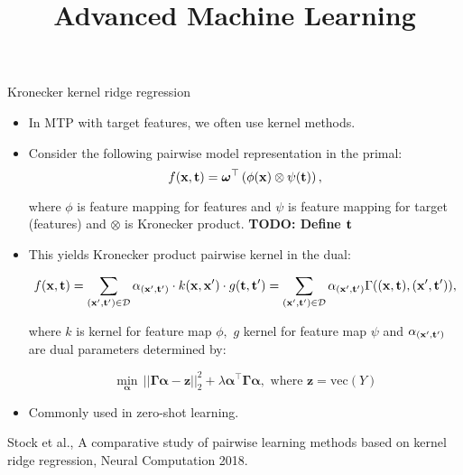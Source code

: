 \documentclass[11pt,compress,t,notes=noshow, xcolor=table]{beamer}
\title{Advanced Machine Learning}
\date{}
\begin{document}



\sloppy



\begin{frame}{Kronecker kernel ridge regression}
	\begin{itemize}

    	\item In MTP with target features, we often use kernel methods.
    
    	\item Consider the following pairwise model representation in the primal: 
    		\begin{equation*}
    			\label{eq:pairwise}
    			f(\mathbf{x},\mathbf{t}) = \bm\omega^\top \left(\phi(\mathbf{x}) \otimes \psi(\mathbf{t}) \right) ,
    		\end{equation*}
    
    	where $\phi$ is feature mapping for features and $\psi$ is feature mapping for target (features) and $\otimes$ is Kronecker product. \textbf{TODO: Define $\mathbf{t}$}
    
    	\item This yields Kronecker product pairwise kernel in the dual:
    	
    	\begin{eqnarray*} 
    		f(\mathbf{x},\mathbf{t})= \sum_{(\mathbf{x}',\mathbf{t}') \in \mathcal{D}} \alpha_{(\mathbf{x}',\mathbf{t}')}  \cdot  k(\mathbf{x},\mathbf{x}') \cdot g(\mathbf{t},\mathbf{t}')  = \sum_{(\mathbf{x}',\mathbf{t}') \in \mathcal{D}} \alpha_{(\mathbf{x}',\mathbf{t}')} \Gamma((\mathbf{x},\mathbf{t}),(\mathbf{x}',\mathbf{t}')),
    	\end{eqnarray*}
    
    	where $k$ is kernel for feature map $\phi,$  $g$ kernel for feature map $\psi$  and $\alpha_{(\mathbf{x}',\mathbf{t}')}$ are dual parameters determined by:
    
    	$$ \min_{\bm{\alpha}} \, ||\bm{\Gamma}\bm{\alpha} -\bm{z} ||^2_2 +\lambda\bm{\alpha }^\top \bm{\Gamma}\bm{\alpha}, \text{ where } \bm{z} = \mathrm{vec}{(Y)}$$
    
    
    
    	\item Commonly used in zero-shot learning.

\end{itemize}

	{\tiny Stock et al., A comparative study of pairwise learning methods based on kernel ridge regression, Neural Computation 2018.}
%	
\end{frame}
\end{document}
